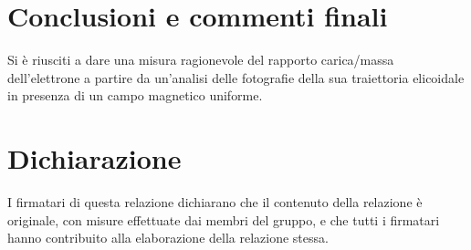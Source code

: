 \documentclass[10pt, a4paper, italian]{article}
\begin{document}
\section*{Conclusioni e commenti finali}
Si è riusciti a dare una misura ragionevole del rapporto carica/massa
dell'elettrone a partire da un'analisi delle fotografie della sua traiettoria
elicoidale in presenza di un campo magnetico uniforme.

\section*{Dichiarazione}
I firmatari di questa relazione dichiarano che il contenuto della relazione \`e
originale, con misure effettuate dai membri del gruppo, e che tutti i firmatari
hanno contribuito alla elaborazione della relazione stessa.

\begin{thebibliography}{1}
\end{thebibliography}
\end{document}

